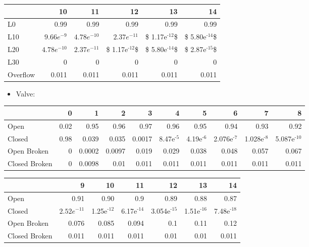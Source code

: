\documentclass[colorlinks=true,linkcolor=blue]{article}
\begin{document}
\begin{center}
\begin{tabular}{l|rrrrr|}
 & 10 & 11 & 12 & 13 & 14\\
\hline
L0 & 0.99 & 0.99 & 0.99 & 0.99 & 0.99\\
L10 & $9.66e^{-9}$ & $4.78e^{-10}$ & $2.37e^{-11}$ & \$ 1.17e$^{\text{-12}}$\$ & \$ 5.80e$^{\text{-14}}$\$\\
L20 & $4.78e^{-10}$ & $2.37e^{-11}$ & \$ 1.17e$^{\text{-12}}$\$ & \$ 5.80e$^{\text{-14}}$\$ & \$ 2.87e$^{\text{-15}}$\$\\
L30 & 0 & 0 & 0 & 0 & 0\\
Overflow & 0.011 & 0.011 & 0.011 & 0.011 & 0.011\\
\end{tabular}
\end{center}

\begin{itemize}
\item Valve:
\end{itemize}
\begin{center}
\begin{tabular}{l|rrrrrrrrr|}
 & 0 & 1 & 2 & 3 & 4 & 5 & 6 & 7 & 8\\
\hline
Open & 0.02 & 0.95 & 0.96 & 0.97 & 0.96 & 0.95 & 0.94 & 0.93 & 0.92\\
Closed & 0.98 & 0.039 & 0.035 & 0.0017 & 8.47e$^{\text{-5}}$ & 4.19e$^{\text{-6}}$ & 2.076e$^{\text{-7}}$ & 1.028e$^{\text{-8}}$ & 5.087e$^{\text{-10}}$\\
Open Broken & 0 & 0.0002 & 0.0097 & 0.019 & 0.029 & 0.038 & 0.048 & 0.057 & 0.067\\
Closed Broken & 0 & 0.0098 & 0.01 & 0.011 & 0.011 & 0.011 & 0.011 & 0.011 & 0.011\\
\end{tabular}
\end{center}

\begin{center}
\begin{tabular}{l|rrrrrr|}
 & 9 & 10 & 11 & 12 & 13 & 14\\
\hline
Open & 0.91 & 0.90 & 0.9 & 0.89 & 0.88 & 0.87\\
Closed & $2.52e^{-11}$ & 1.25e$^{\text{-12}}$ & 6.17e$^{\text{-14}}$ & 3.054e$^{\text{-15}}$ & 1.51e$^{\text{-16}}$ & 7.48e$^{\text{-18}}$\\
Open Broken & 0.076 & 0.085 & 0.094 & 0.1 & 0.11 & 0.12\\
Closed Broken & 0.011 & 0.011 & 0.011 & 0.01 & 0.01 & 0.011\\
\end{tabular}
\end{center}
\end{document}
